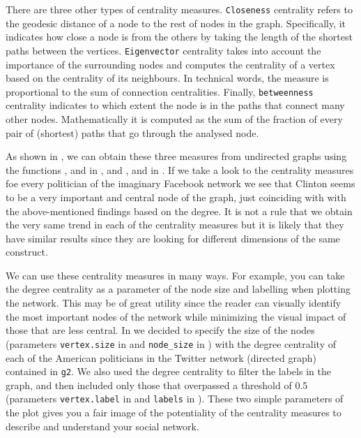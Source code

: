 
There are three other types of centrality measures. \texttt{Closeness} centrality refers to the geodesic distance of a node to the rest of nodes in the graph. Specifically, it indicates how close a node is from the others by taking the length of the shortest paths between the vertices. \texttt{Eigenvector} centrality takes into account the importance of the surrounding nodes and computes the centrality of a vertex based on the centrality of its neighbours. In technical words, the measure is proportional to the sum of connection centralities. Finally, \texttt{betweenness} centrality indicates to which extent the node is in the paths that connect many other nodes. Mathematically it is computed as the sum of the fraction of every pair of (shortest) paths that go through the analysed node. 

As shown in , we can obtain these three measures from undirected graphs using the functions ,  and  in , and ,  and  in . If we take a look to the centrality measures foe every politician of the imaginary Facebook network we see that Clinton seems to be a very important and central node of the graph, just coinciding with with the above-mentioned findings based on the degree. It is not a rule that we obtain the very same trend in each of the centrality measures but it is likely that they have similar results since they are looking for different dimensions of the same construct.


We can use these centrality measures in many ways. For example, you can take the degree centrality as a parameter of the node size and labelling when plotting the network. This may be of great utility since the reader can visually identify the most important nodes of the network while minimizing the visual impact of those that are less central. In  we decided to specify the size of the nodes (parameters \verb|vertex.size| in  and \verb|node_size| in ) with the degree centrality of each of the American politicians in the Twitter network (directed graph) contained in \texttt{g2}. We also used the degree centrality to filter the labels in the graph, and then included only those that overpassed a threshold of 0.5 (parameters \verb|vertex.label| in  and \verb|labels| in ). These two simple parameters of the plot gives you a fair image of the potentiality of the centrality measures to describe and understand your social network.


